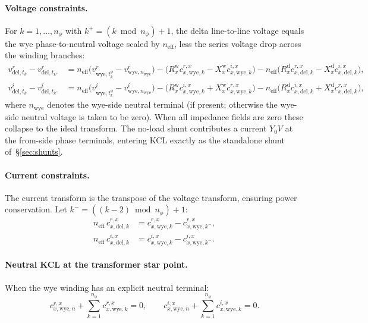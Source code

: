 \documentclass[11pt,a4paper]{article}
\newcommand{\vr}[2]{v^r_{#1,#2}}
\newcommand{\vi}[2]{v^i_{#1,#2}}
\begin{document}
\paragraph{Voltage constraints.}
For $k = 1,\ldots,n_\phi$ with $k^+ = (k \bmod n_\phi)+1$, the delta line-to-line
voltage equals the wye phase-to-neutral voltage scaled by $n_\text{eff}$, less
the series voltage drop across the winding branches:
%
\begin{align}
  \vr{\text{del}}{t_k} - \vr{\text{del}}{t_{k^+}}
  &= n_\text{eff}\bigl(\vr{\text{wye}}{t^\phi_k} - \vr{\text{wye}}{n_\text{wye}}\bigr)
     - \bigl(R^\text{w}_x c^{r,x}_{x,\text{wye},k} - X^\text{w}_x c^{i,x}_{x,\text{wye},k}\bigr)
     - n_\text{eff}\bigl(R^\text{d}_x c^{r,x}_{x,\text{del},k} - X^\text{d}_x c^{i,x}_{x,\text{del},k}\bigr),
  \label{eq:yd-v-r}\\
  \vi{\text{del}}{t_k} - \vi{\text{del}}{t_{k^+}}
  &= n_\text{eff}\bigl(\vi{\text{wye}}{t^\phi_k} - \vi{\text{wye}}{n_\text{wye}}\bigr)
     - \bigl(R^\text{w}_x c^{i,x}_{x,\text{wye},k} + X^\text{w}_x c^{r,x}_{x,\text{wye},k}\bigr)
     - n_\text{eff}\bigl(R^\text{d}_x c^{i,x}_{x,\text{del},k} + X^\text{d}_x c^{r,x}_{x,\text{del},k}\bigr),
  \label{eq:yd-v-i}
\end{align}
%
where $n_\text{wye}$ denotes the wye-side neutral terminal (if present; otherwise
the wye-side neutral voltage is taken to be zero).  When all impedance fields
are zero these collapse to the ideal transform.  The no-load shunt contributes
a current $Y_0 V$ at the from-side phase terminals, entering KCL exactly as the
standalone shunt of~\S\ref{sec:shunts}.

\paragraph{Current constraints.}
The current transform is the transpose of the voltage transform, ensuring power
conservation.  Let $k^- = ((k-2)\bmod n_\phi)+1$:
%
\begin{align}
  n_\text{eff}\,c^{r,x}_{x,\text{del},k}
  &= c^{r,x}_{x,\text{wye},k} - c^{r,x}_{x,\text{wye},k^-},
  \label{eq:yd-i-r}\\
  n_\text{eff}\,c^{i,x}_{x,\text{del},k}
  &= c^{i,x}_{x,\text{wye},k} - c^{i,x}_{x,\text{wye},k^-}.
  \label{eq:yd-i-i}
\end{align}

\paragraph{Neutral KCL at the transformer star point.}
When the wye winding has an explicit neutral terminal:
%
\begin{equation}
  c^{r,x}_{x,\text{wye},n} + \sum_{k=1}^{n_\phi} c^{r,x}_{x,\text{wye},k} = 0,
  \qquad
  c^{i,x}_{x,\text{wye},n} + \sum_{k=1}^{n_\phi} c^{i,x}_{x,\text{wye},k} = 0.
  \label{eq:yd-neutral}
\end{equation}
\end{document}
